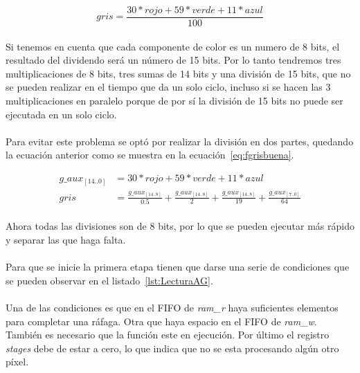 \documentclass[a4paper,12pt,titlepage,final]{book}
\begin{document}
\begin{equation}\label{eq:fgrismala}
gris = \frac{30*rojo + 59*verde + 11*azul}{100}
\end{equation}

\paragraph{}
Si tenemos en cuenta que cada componente de color es un numero de 8 bits, el resultado del dividendo será un número de 15 bits. Por lo tanto tendremos tres multiplicaciones de 8 bits, tres sumas de 14 bits y una división de 15 bits, que no se pueden realizar en el tiempo que da un solo ciclo, incluso si se hacen las 3 multiplicaciones en paralelo porque de por sí la división de 15 bits no puede ser ejecutada en un solo ciclo. 

\paragraph{}
Para evitar este problema se optó por realizar la división en dos partes, quedando la ecuación anterior como se muestra en la ecuación~\ref{eq:fgrisbuena}.

\begin{subequations}\label{eq:fgrisbuena}
\begin{align}
        g\_aux_{[14..0]}&=30*rojo + 59*verde + 11*azul\\
        gris &= \frac{g\_aux_{[14..8]}}{0.5}+\frac{g\_aux_{[14..8]}}{2}+\frac{g\_aux_{[14..8]}}{19}+\frac{g\_aux_{[7..0]}}{64}
\end{align}
\end{subequations}

\paragraph{}
Ahora todas las divisiones son de 8 bits, por lo que se pueden ejecutar más rápido y separar las que haga falta.

\paragraph{}
Para que se inicie la primera etapa tienen que darse una serie de condiciones que se pueden observar en el listado~\ref{lst:LecturaAG}.



\paragraph{}
Una de las condiciones es que en el FIFO de \textit{ram\_r }haya suficientes elementos para completar una ráfaga. Otra que haya espacio en el FIFO de \textit{ram\_w}. También es necesario que la función este en ejecución. Por último el registro \textit{stages} debe de estar a cero, lo que indica que no se esta procesando algún otro píxel.
\end{document}
